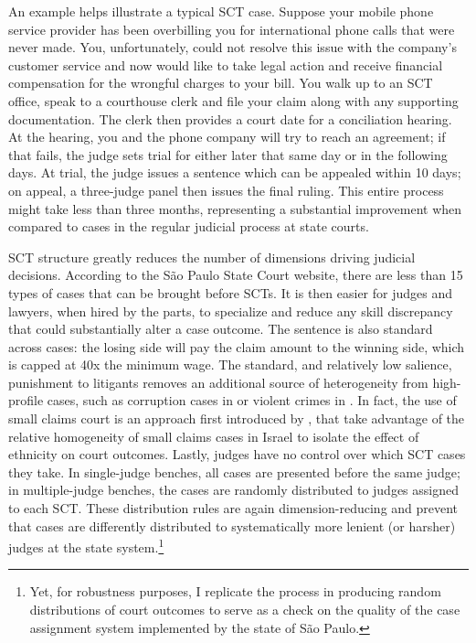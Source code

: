 \documentclass[11pt]{article}
\begin{document}
An example helps illustrate a typical SCT case. Suppose your mobile phone service provider has been overbilling you for international phone calls that were never made. You, unfortunately, could not resolve this issue with the company's customer service and now would like to take legal action and receive financial compensation for the wrongful charges to your bill. You walk up to an SCT office, speak to a courthouse clerk and file your claim along with any supporting documentation. The clerk then provides a court date for a conciliation hearing. At the hearing, you and the phone company will try to reach an agreement; if that fails, the judge sets trial for either later that same day or in the following days. At trial, the judge issues a sentence which can be appealed within 10 days; on appeal, a three-judge panel then issues the final ruling. This entire process might take less than three months, representing a substantial improvement when compared to cases in the regular judicial process at state courts.

SCT structure greatly reduces the number of dimensions driving judicial decisions. According to the São Paulo State Court website, there are less than 15 types of cases that can be brought before SCTs. It is then easier for judges and lawyers, when hired by the parts, to specialize and reduce any skill discrepancy that could substantially alter a case outcome. The sentence is also standard across cases: the losing side will pay the claim amount to the winning side, which is capped at 40x the minimum wage. The standard, and relatively low salience, punishment to litigants removes an additional source of heterogeneity from high-profile cases, such as corruption cases in \citet{LambaisJudicialSubversionEvidence2018} or violent crimes in \citet{LimJudgePoliticianPress2015}. In fact, the use of small claims court is an approach first introduced by \citet{ShayoJudicialIngroupBias2011}, that take advantage of the relative homogeneity of small claims cases in Israel to isolate the effect of ethnicity on court outcomes. Lastly, judges have no control over which SCT cases they take. In single-judge benches, all cases are presented before the same judge; in multiple-judge benches, the cases are randomly distributed to judges assigned to each SCT. These distribution rules are again dimension-reducing and prevent that cases are differently distributed to systematically more lenient (or harsher) judges at the state system.\footnote{Yet, for robustness purposes, I replicate the process in \citet{AbramsJudgesVaryTheir2012} producing random distributions of court outcomes to serve as a check on the quality of the case assignment system implemented by the state of São Paulo.}
\end{document}
